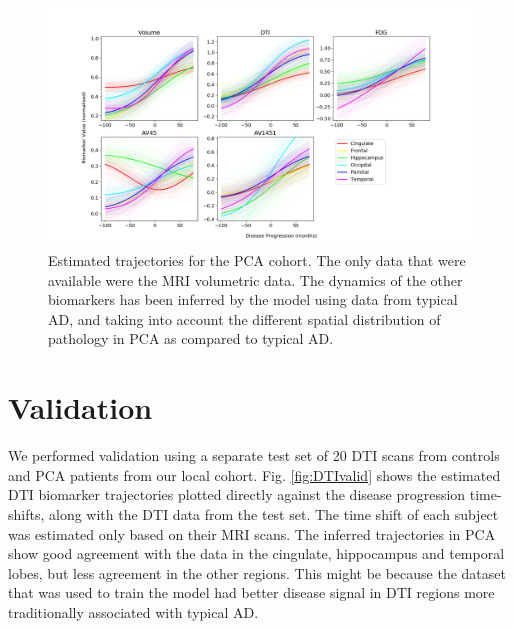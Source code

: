 \documentclass{llncs}
\begin{document}
\begin{figure}
 \includegraphics[width=\textwidth, trim=0 20 0 0, clip]{figures/trajDisSpaceOverlap_PCA_tad-drcTinyPen1_JMD.png}
 \caption{Estimated trajectories for the PCA cohort. The only data that were available were the MRI volumetric data. The dynamics of the other biomarkers has been inferred by the model using data from typical AD, and taking into account the different spatial distribution of pathology in PCA as compared to typical AD.}
 \label{fig:PCAtrajByModality}
\end{figure}
% 
% 


\section{Validation}

We performed validation using a separate test set of 20 DTI scans from controls and PCA patients from our local cohort. Fig. \ref{fig:DTIvalid} shows the estimated DTI biomarker trajectories plotted directly against the disease progression time-shifts, along with the DTI data from the test set. The time shift of each subject was estimated only based on their MRI scans. The inferred trajectories in PCA show good agreement with the data in the cingulate, hippocampus and temporal lobes, but less agreement in the other regions. This might be because the dataset that was used to train the model had better disease signal in DTI regions more traditionally associated with typical AD.
\end{document}
